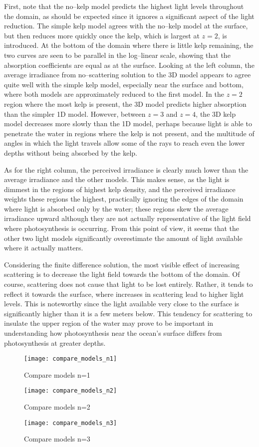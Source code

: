 First, note that the no--kelp model predicts the highest light levels throughout the domain, as should be expected since it ignores a significant aspect of the light reduction.
The simple kelp model agrees with the no--kelp model at the surface, but then reduces more quickly once the kelp, which is largest at $z=2$, is introduced.
At the bottom of the domain where there is little kelp remaining, the two curves are seen to be parallel in the log--linear scale, showing that the absorption coefficients are equal as at the surface.
Looking at the left column, the average irradiance from no--scattering solution to the 3D model appears to agree quite well with the simple kelp model, especially near the surface and bottom, where both models are approximately reduced to the first model.
In the $z=2$ region where the most kelp is present, the 3D model predicts higher absorption than the simpler 1D model.
However, between $z=3$ and $z=4$, the 3D kelp model decreases more slowly than the 1D model, perhaps because light is able to penetrate the water in regions where the kelp is not present, and the multitude of angles in which the light travels allow some of the rays to reach even the lower depths without being absorbed by the kelp.

As for the right column, the perceived irradiance is clearly much lower than the average irradiance and the other models.
This makes sense, as the light is dimmest in the regions of highest kelp density, and the perceived irradiance weights these regions the highest, practically ignoring the edges of the domain where light is absorbed only by the water; these regions skew the average irradiance upward although they are not actually representative of the light field where photosynthesis is occurring.
From this point of view, it seems that the other two light models significantly overestimate the amount of light available where it actually matters.

Considering the finite difference solution, the most visible effect of increasing scattering is to decrease the light field towards the bottom of the domain.
Of course, scattering does not cause that light to be lost entirely.
Rather, it tends to reflect it towards the surface, where increases in scattering lead to higher light levels.
This is noteworthy since the light available very close to the surface is significantly higher than it is a few meters below.
This tendency for scattering to insulate the upper region of the water may prove to be important in understanding how photosynthesis near the ocean's surface differs from photosynthesis at greater depths.


\begin{figure}[H]
  \centering
  \texttt{[image: compare\_models\_n1]}
  \caption{Compare models n=1}
  \label{fig:compare_models_n1}
\end{figure}
\begin{figure}[H]
  \centering
  \texttt{[image: compare\_models\_n2]}
  \caption{Compare models n=2}
  \label{fig:compare_models_n2}
\end{figure}
\begin{figure}[H]
  \centering
  \texttt{[image: compare\_models\_n3]}
  \caption{Compare models n=3}
  \label{fig:compare_models_n3}
\end{figure}
